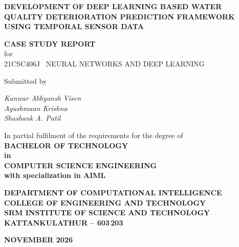 \documentclass[12pt,a4paper]{report}
\numberwithin{table}{chapter}
\numberwithin{figure}{chapter}
\begin{document}


\begin{titlepage}
\centering
\vspace*{1.5cm}

{\fontsize{18}{22}\selectfont\bfseries
DEVELOPMENT OF DEEP LEARNING BASED WATER QUALITY DETERIORATION PREDICTION FRAMEWORK USING TEMPORAL SENSOR DATA\\[0.4cm]}

{\fontsize{16}{20}\selectfont\bfseries CASE STUDY REPORT\\[0.15cm]}
{\fontsize{14}{18}\selectfont for\\[0.2cm]}
{\fontsize{14}{18}\selectfont 21CSC406J \textendash\ NEURAL NETWORKS AND DEEP LEARNING\\[0.6cm]}

{\fontsize{14}{18}\selectfont Submitted by\\[0.3cm]}

{\fontsize{14}{18}\selectfont\itshape
Kunwar Abhyansh Visen \quad [RA2311026010576]\\[0.2cm]
Ayushmaan Krishna \quad [RA2311026010570]\\[0.2cm]
Shashank A. Patil \quad [RA2311026010573]\\[0.6cm]}

In partial fulfilment of the requirements for the degree of\\[0.4cm]

{\fontsize{14}{18}\selectfont\bfseries
BACHELOR OF TECHNOLOGY\\[0.15cm]
in\\[0.15cm]
COMPUTER SCIENCE ENGINEERING\\[0.15cm]
with specialization in AIML\\[0.6cm]}

{\fontsize{16}{20}\selectfont\bfseries
DEPARTMENT OF COMPUTATIONAL INTELLIGENCE\\
COLLEGE OF ENGINEERING AND TECHNOLOGY\\
SRM INSTITUTE OF SCIENCE AND TECHNOLOGY\\
KATTANKULATHUR -- 603\,203\\[0.5cm]}

{\fontsize{16}{20}\selectfont\bfseries NOVEMBER 2026}
\end{titlepage}
\end{document}

